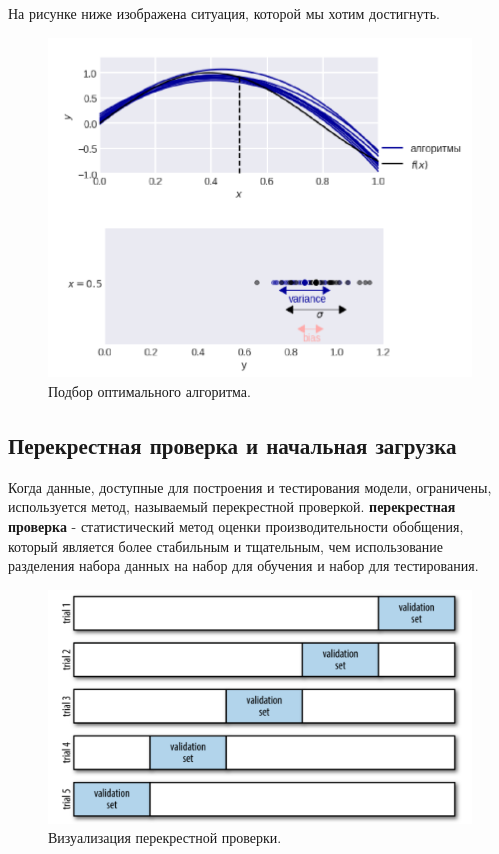 \documentclass{article}
\begin{document}
На рисунке ниже изображена ситуация, которой мы хотим достигнуть.

\begin{figure}[H]
    \centering
    \includegraphics[scale=0.4]{optimal_decision.png}
    \caption{Подбор оптимального алгоритма.}
    \label{fig:my_label}
\end{figure}

\subsection{Перекрестная проверка и начальная загрузка}

Когда данные, доступные для построения и тестирования модели, ограничены, используется метод, называемый перекрестной проверкой. \textbf{перекрестная проверка} - статистический метод оценки производительности обобщения, который является более стабильным и тщательным, чем использование разделения набора данных на набор для обучения и набор для тестирования. 

\begin{figure}[H]
    \centering
    \includegraphics[scale=0.3]{crosval.png}
    \caption{Визуализация перекрестной проверки.}
    \label{fig:my_label}
\end{figure}
\end{document}
